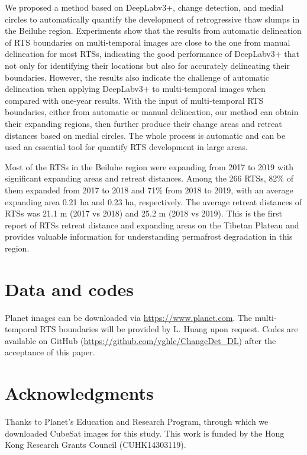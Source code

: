 \documentclass[authoryear,preprint,review,12pt]{elsarticle}
\begin{document}
We proposed a method based on DeepLabv3+, change detection, and medial circles to automatically quantify the development of retrogressive thaw slumps in the Beiluhe region. 
Experiments show that the results from automatic delineation of RTS boundaries on multi-temporal images are close to the one from manual delineation for most RTSs, indicating the good performance of DeepLabv3+  that not only for identifying their locations but also for accurately delineating their boundaries. 
However, the results also indicate the challenge of automatic delineation when applying DeepLabv3+ to multi-temporal images when compared with one-year results. 
With the input of multi-temporal RTS boundaries, either from automatic or manual delineation, our method can obtain their expanding regions, then further produce their change areas and retreat distances based on medial circles. 
The whole process is automatic and can be used an essential tool for quantify RTS development in large areas. 

Most of the RTSs in the Beiluhe region were expanding from 2017 to 2019 with significant expanding areas and retreat distances. 
Among the 266 RTSs, 82\% of them expanded from 2017 to 2018 and 71\% from 2018 to 2019, with an average expanding area 0.21 ha and 0.23 ha, respectively.
The average retreat distances of RTSs was 21.1 m (2017 vs 2018) and 25.2 m (2018 vs 2019).
This is the first report of RTSs retreat distance and expanding areas on the Tibetan Plateau and provides valuable information for understanding permafrost degradation in this region. 


\section{Data and codes}
\label{sec_data_codes}

Planet images can be downloaded via \url{https://www.planet.com}. 
The multi-temporal RTS boundaries will be provided by L. Huang upon request. 
Codes are available on GitHub (\url{https://github.com/yghlc/ChangeDet_DL}) after the acceptance of this paper.

\section{Acknowledgments}
\label{sec_acknowledgments}


Thanks to Planet's Education and Research Program, through which we downloaded CubeSat images for this study. 
This work is funded by the Hong Kong Research Grants Council (CUHK14303119).
\end{document}
